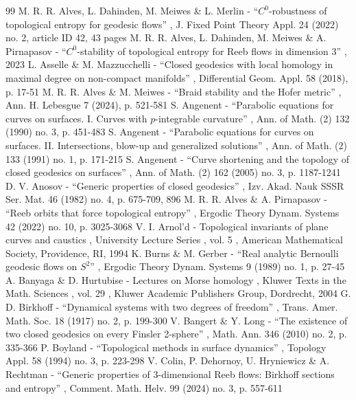 \documentclass[11pt]{article}
\theoremstyle{plain}
\theoremstyle{definition}
\begin{document}
\begin{thebibliography}{99}
 M. R. R. Alves, L. Dahinden, M. Meiwes \& L. Merlin - “$C^0$-robustness of topological entropy for geodesic flows” , J. Fixed Point Theory Appl. 24 (2022) no. 2, article ID 42, 43 pages
 M. R. R. Alves, L. Dahinden, M. Meiwes \& A. Pirnapasov - “${C}^0$-stability of topological entropy for Reeb flows in dimension $3$” , 2023
 L. Asselle \& M. Mazzucchelli - “Closed geodesics with local homology in maximal degree on non-compact manifolds” , Differential Geom. Appl. 58 (2018), p. 17-51
 M. R. R. Alves \& M. Meiwes - “Braid stability and the Hofer metric” , Ann. H. Lebesgue 7 (2024), p. 521-581
 S. Angenent - “Parabolic equations for curves on surfaces. I. Curves with $p$-integrable curvature” , Ann. of Math. (2) 132 (1990) no. 3, p. 451-483
 S. Angenent - “Parabolic equations for curves on surfaces. II. Intersections, blow-up and generalized solutions” , Ann. of Math. (2) 133 (1991) no. 1, p. 171-215
 S. Angenent - “Curve shortening and the topology of closed geodesics on surfaces” , Ann. of Math. (2) 162 (2005) no. 3, p. 1187-1241
 D. V. Anosov - “Generic properties of closed geodesics” , Izv. Akad. Nauk SSSR Ser. Mat. 46 (1982) no. 4, p. 675-709, 896
 M. R. R. Alves \& A. Pirnapasov - “Reeb orbits that force topological entropy” , Ergodic Theory Dynam. Systems 42 (2022) no. 10, p. 3025-3068
 V. I. Arnol’d - Topological invariants of plane curves and caustics , University Lecture Series , vol. 5 , American Mathematical Society, Providence, RI, 1994
 K. Burns \& M. Gerber - “Real analytic Bernoulli geodesic flows on $S^2$” , Ergodic Theory Dynam. Systems 9 (1989) no. 1, p. 27-45
 A. Banyaga \& D. Hurtubise - Lectures on Morse homology , Kluwer Texts in the Math. Sciences , vol. 29 , Kluwer Academic Publishers Group, Dordrecht, 2004
 G. D. Birkhoff - “Dynamical systems with two degrees of freedom” , Trans. Amer. Math. Soc. 18 (1917) no. 2, p. 199-300
 V. Bangert \& Y. Long - “The existence of two closed geodesics on every Finsler 2-sphere” , Math. Ann. 346 (2010) no. 2, p. 335-366
 P. Boyland - “Topological methods in surface dynamics” , Topology Appl. 58 (1994) no. 3, p. 223-298
 V. Colin, P. Dehornoy, U. Hryniewicz \& A. Rechtman - “Generic properties of $3$-dimensional Reeb flows: Birkhoff sections and entropy” , Comment. Math. Helv. 99 (2024) no. 3, p. 557-611

\end{thebibliography}
\end{document}
